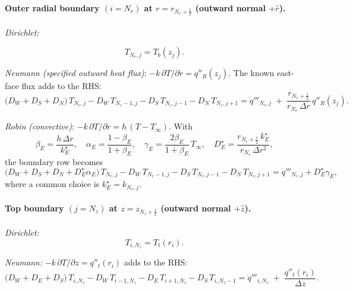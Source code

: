 \documentclass[11pt]{article}
\begin{document}
\paragraph{Outer radial boundary \((i=N_r)\) at \(r=r_{N_r+\frac12}\) (outward normal \(+\hat r\)).}
\emph{Dirichlet:} 

\begin{equation}
\tag{E3D}
 T_{N_r,j}=T_b(z_j).
\end{equation}


\emph{Neumann (specified outward heat flux)}: \(-k\,\partial T/\partial r = q''_R(z_j)\). The known east-face flux adds to the RHS:
\begin{equation}\tag{E3N}
\big(D_W{+}D_S{+}D_N\big)\,T_{N_r,j}
- D_W\,T_{N_r-1,j}
- D_S\,T_{N_r,j-1}
- D_N\,T_{N_r,j+1}
= \dot q'''_{N_r,j} \;+\; \frac{r_{N_r+\frac12}}{r_{N_r}\,\Delta r}\,q''_R(z_j).
\end{equation}

\emph{Robin (convective)}: \(-k\,\partial T/\partial r = h\,(T-T_\infty)\). With
\begin{equation}
\beta_E=\frac{h\,\Delta r}{k_E^{\star}},\quad
\alpha_E=\frac{1-\beta_E}{1+\beta_E},\quad
\gamma_E=\frac{2\beta_E}{1+\beta_E}\,T_\infty,\quad
D_E^{\star}=\frac{r_{N_r+\frac12}\,k_E^{\star}}{r_{N_r}\,\Delta r^2},
\end{equation}
the boundary row becomes
\begin{equation}\tag{E3R}
\big(D_W{+}D_S{+}D_N{+}D_E^{\star}\alpha_E\big)\,T_{N_r,j}
- D_W\,T_{N_r-1,j}
- D_S\,T_{N_r,j-1}
- D_N\,T_{N_r,j+1}
= \dot q'''_{N_r,j} + D_E^{\star}\gamma_E,
\end{equation}
where a common choice is \(k_E^{\star}=k_{N_r,j}\).

\paragraph{Top boundary \((j=N_z)\) at \(z=z_{N_z+\frac12}\) (outward normal \(+\hat z\)).}
\emph{Dirichlet:}
\begin{equation}
\tag{E4D}
 T_{i,N_z}=T_t(r_i).
\end{equation}



\emph{Neumann:} \(-k\,\partial T/\partial z=q''_t(r_i)\) adds to the RHS:
\begin{equation}\tag{E4N}
\big(D_W{+}D_E{+}D_S\big)\,T_{i,N_z}
- D_W\,T_{i-1,N_z}
- D_E\,T_{i+1,N_z}
- D_S\,T_{i,N_z-1}
= \dot q'''_{i,N_z} \;+\; \frac{q''_t(r_i)}{\Delta z}.
\end{equation}
\end{document}
